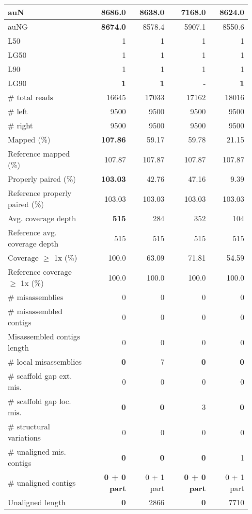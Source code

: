 \documentclass[12pt,a4paper]{article}
\begin{document}
\begin{table}[ht]
\begin{center}
\begin{tabular}{|l*{4}{|r}|}
auN & {\bf 8686.0} & 8638.0 & 7168.0 & 8624.0 \\ \hline
auNG & {\bf 8674.0} & 8578.4 & 5907.1 & 8550.6 \\ \hline
L50 & 1 & 1 & 1 & 1 \\ \hline
LG50 & 1 & 1 & 1 & 1 \\ \hline
L90 & 1 & 1 & 1 & 1 \\ \hline
LG90 & {\bf 1} & {\bf 1} & - & {\bf 1} \\ \hline
\# total reads & 16645 & 17033 & 17162 & 18016 \\ \hline
\# left & 9500 & 9500 & 9500 & 9500 \\ \hline
\# right & 9500 & 9500 & 9500 & 9500 \\ \hline
Mapped (\%) & {\bf 107.86} & 59.17 & 59.78 & 21.15 \\ \hline
Reference mapped (\%) & 107.87 & 107.87 & 107.87 & 107.87 \\ \hline
Properly paired (\%) & {\bf 103.03} & 42.76 & 47.16 & 9.39 \\ \hline
Reference properly paired (\%) & 103.03 & 103.03 & 103.03 & 103.03 \\ \hline
Avg. coverage depth & {\bf 515} & 284 & 352 & 104 \\ \hline
Reference avg. coverage depth & 515 & 515 & 515 & 515 \\ \hline
Coverage $\geq$ 1x (\%) & 100.0 & 63.09 & 71.81 & 54.59 \\ \hline
Reference coverage $\geq$ 1x (\%) & 100.0 & 100.0 & 100.0 & 100.0 \\ \hline
\# misassemblies & 0 & 0 & 0 & 0 \\ \hline
\# misassembled contigs & 0 & 0 & 0 & 0 \\ \hline
Misassembled contigs length & 0 & 0 & 0 & 0 \\ \hline
\# local misassemblies & {\bf 0} & 7 & {\bf 0} & {\bf 0} \\ \hline
\# scaffold gap ext. mis. & 0 & 0 & 0 & 0 \\ \hline
\# scaffold gap loc. mis. & {\bf 0} & {\bf 0} & 3 & {\bf 0} \\ \hline
\# structural variations & 0 & 0 & 0 & 0 \\ \hline
\# unaligned mis. contigs & {\bf 0} & {\bf 0} & {\bf 0} & 1 \\ \hline
\# unaligned contigs & {\bf 0 + 0 part} & 0 + 1 part & {\bf 0 + 0 part} & 0 + 1 part \\ \hline
Unaligned length & {\bf 0} & 2866 & {\bf 0} & 7710 \\ \hline

\end{tabular}
\end{center}
\end{table}
\end{document}
